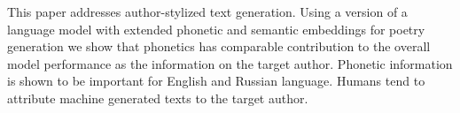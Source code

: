 This paper addresses author-stylized text generation. Using a version of a language model with extended phonetic and semantic embeddings for poetry generation we show that phonetics has comparable contribution to the overall model performance as the information on the target author. Phonetic information is shown to be important for English and Russian language. Humans tend to attribute machine generated texts to the target author.
